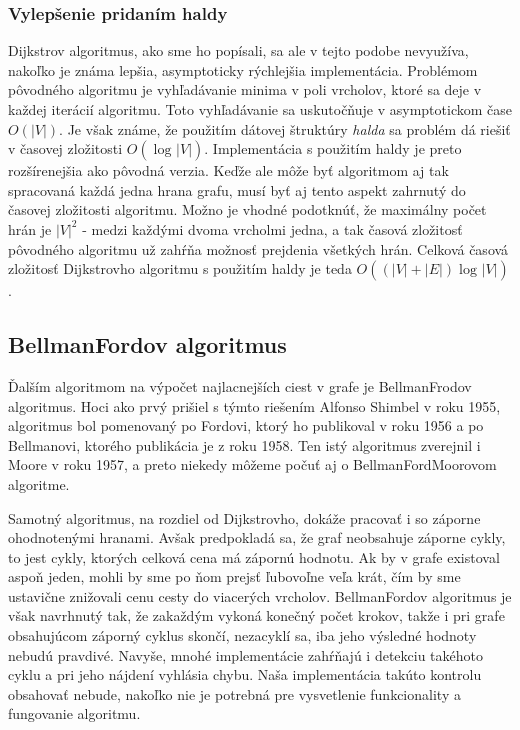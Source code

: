 \subsubsection{Vylepšenie pridaním haldy}

Dijkstrov algoritmus, ako sme ho popísali, sa ale v tejto podobe nevyužíva, nakoľko je známa lepšia, asymptoticky rýchlejšia implementácia. Problémom pôvodného algoritmu je vyhľadávanie minima v poli vrcholov, ktoré sa deje v každej iterácií algoritmu. Toto vyhľadávanie sa uskutočňuje v asymptotickom čase $O(|V|)$. Je však známe, že použitím dátovej štruktúry \textit{halda} sa problém dá riešiť v časovej zložitosti $O(\log_{}|V|)$. Implementácia s použitím haldy je preto rozšírenejšia ako pôvodná verzia. Keďže ale môže byť algoritmom aj tak spracovaná každá jedna hrana grafu, musí byť aj tento aspekt zahrnutý do časovej zložitosti algoritmu. Možno je vhodné podotknúť, že maximálny počet hrán je $|V|^{2}$ - medzi každými dvoma vrcholmi jedna, a tak časová zložitosť pôvodného algoritmu už zahŕňa možnosť prejdenia všetkých hrán. Celková časová zložitosť Dijkstrovho algoritmu s použitím haldy je teda $O((|V| + |E|)\log_{}|V|)$.\newline


\subsection{Bellman\textendash Fordov algoritmus}

Ďalším algoritmom na výpočet najlacnejších ciest v grafe je Bellman\textendash Frodov algoritmus. Hoci ako prvý prišiel s týmto riešením Alfonso Shimbel v roku 1955, algoritmus bol pomenovaný po Fordovi, ktorý ho publikoval v roku 1956 a po Bellmanovi, ktorého publikácia je z roku 1958. Ten istý algoritmus zverejnil i Moore v roku 1957, a preto niekedy môžeme počuť aj o Bellman\textendash Ford\textendash Moorovom algoritme.\newline

Samotný algoritmus, na rozdiel od Dijkstrovho, dokáže pracovať i so záporne ohodnotenými hranami. Avšak predpokladá sa, že graf neobsahuje záporne cykly, to jest cykly, ktorých celková cena má zápornú hodnotu. Ak by v grafe existoval aspoň jeden, mohli by sme po ňom prejsť ľubovoľne veľa krát, čím by sme ustavične znižovali cenu cesty do viacerých vrcholov. Bellman\textendash Fordov algoritmus je však navrhnutý tak, že zakaždým vykoná konečný počet krokov, takže i pri grafe obsahujúcom záporný cyklus skončí, nezacyklí sa, iba jeho výsledné hodnoty nebudú pravdivé. Navyše, mnohé implementácie zahŕňajú i detekciu takéhoto cyklu a pri jeho nájdení vyhlásia chybu. Naša implementácia takúto kontrolu obsahovať nebude, nakoľko nie je potrebná pre vysvetlenie funkcionality a fungovanie algoritmu.\newline

